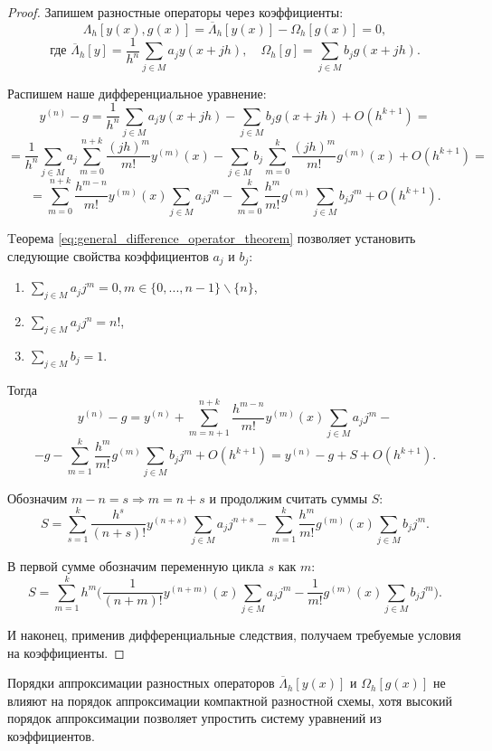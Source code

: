 \documentclass[../main.tex]{subfile}
\begin{document}
\begin{proof}
	Запишем разностные операторы через коэффициенты:
	\[\Lambda_h[y(x),g(x)]=\overline{\Lambda}_h[y(x)]-\Omega_h[g(x)]=0,\]
	\[\text{где }\overline{\Lambda}_h[y]=\frac{1}{h^n}\sum_{j\in M}a_j
	y(x+jh),\quad\Omega_h[g]=\sum_{j\in M}b_jg(x+jh).\]

	Распишем наше дифференциальное уравнение:
	\[y^{(n)}-g=\frac{1}{h^n}\sum_{j\in M}a_jy(x+jh)-\sum_{j\in M}b_j
	g(x+jh)+O(h^{k+1})=\]
	\[=\frac{1}{h^n}\sum_{j\in M}a_j\sum_{m=0}^{n+k} \frac{(jh)^m}{m!}
	y^{(m)}(x)-\sum_{j\in M}b_j\sum_{m=0}^{k}\frac{(jh)^m}{m!}g^{(m)}(x)+
	O(h^{k+1})=\]
	\[=\sum_{m=0}^{n+k}\frac{h^{m-n}}{m!}y^{(m)}(x)\sum_{j\in M}a_jj^m-
	\sum_{m=0}^{k}\frac{h^m}{m!}g^{(m)}\sum_{j\in M}b_jj^m+O(h^{k+1}).\]

	Tеорема \eqref{eq:general_difference_operator_theorem} позволяет
	установить следующие свойства коэффициентов $a_j$ и $b_j$:
	\begin{enumerate}[nosep]
		\item $\sum_{j\in M}a_jj^m=0,m\in\{0,...,n-1\}\backslash\{n\}$,
		\item $\sum_{j\in M}a_jj^n=n!$,
		\item $\sum_{j\in M}b_j=1$.
	\end{enumerate}

	Тогда
	\[y^{(n)}-g=y^{(n)}+\sum_{m=n+1}^{n+k}\frac{h^{m-n}}{m!}y^{(m)}(x)
	\sum_{j\in M}a_jj^m-\]
	\[-g-\sum_{m=1}^{k}\frac{h^m}{m!}g^{(m)}\sum_{j\in M}b_jj^m+O(h^{k+1})=
	y^{(n)}-g+S+O(h^{k+1}).\]

	Обозначим $m-n=s\Rightarrow m=n+s$ и продолжим считать суммы $S$:
	\[S=\sum_{s=1}^{k}\frac{h^s}{(n+s)!}y^{(n+s)}\sum_{j\in M}a_jj^{n+s}-
	\sum_{m=1}^{k}\frac{h^m}{m!}g^{(m)}(x)\sum_{j\in M}b_jj^m.\]

	В первой сумме обозначим переменную цикла $s$ как $m$:
	\[S=\sum_{m=1}^{k}h^m\Big(\frac{1}{(n+m)!}y^{(n+m)}(x)\sum_{j\in M}a_j
	j^m-\frac{1}{m!}g^{(m)}(x)\sum_{j\in M}b_jj^m\Big).\]

	И наконец, применив дифференциальные следствия, получаем требуемые
	условия на коэффициенты.
\end{proof}

\begin{remark}
	Порядки аппроксимации разностных операторов $\overline{\Lambda}_h[y(x)]$
	и $\Omega_h[g(x)]$ не влияют на порядок аппроксимации компактной
	разностной схемы, хотя высокий порядок аппроксимации позволяет упростить
	систему уравнений из коэффициентов.
\end{remark}
\end{document}
